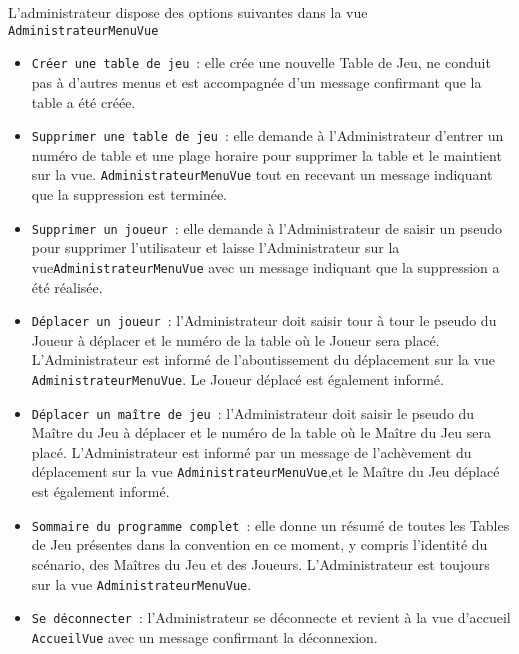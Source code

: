 \documentclass[11pt]{article}
\begin{document}
L'administrateur dispose des options suivantes dans la vue \texttt{AdministrateurMenuVue}
\begin{itemize}[label=, font=\small]
    \item \texttt{Créer une table de jeu}~: elle crée une nouvelle Table de Jeu, ne conduit pas à d'autres menus et est accompagnée d'un message confirmant que la table a été créée.
    \item \texttt{Supprimer une table de jeu}~: elle demande à l'Administrateur d'entrer un numéro de table et une plage horaire pour supprimer la table et le maintient sur la vue. \texttt{AdministrateurMenuVue} tout en recevant un message indiquant que la suppression est terminée.
    \item \texttt{Supprimer un joueur}~: elle demande à l'Administrateur de saisir un pseudo pour supprimer l'utilisateur et laisse l'Administrateur sur la vue\texttt{AdministrateurMenuVue} avec un message indiquant que la suppression a été réalisée.
    \item \texttt{Déplacer un joueur}~: l'Administrateur doit saisir tour à tour le pseudo du Joueur à déplacer et le numéro de la table où le Joueur sera placé. L'Administrateur est informé de l'aboutissement du déplacement sur la vue \texttt{AdministrateurMenuVue}. Le Joueur déplacé est également informé.
    \item \texttt{Déplacer un maître de jeu}~: l'Administrateur doit saisir le pseudo du Maître du Jeu à déplacer et le numéro de la table où le Maître du Jeu sera placé. L'Administrateur est informé par un message de l'achèvement du déplacement sur la vue \texttt{AdministrateurMenuVue},et le Maître du Jeu déplacé est également informé.
    \item \texttt{Sommaire du programme complet}~: elle donne un résumé de toutes les Tables de Jeu présentes dans la convention en ce moment, y compris l'identité du scénario, des Maîtres du Jeu et des Joueurs. L'Administrateur est toujours sur la vue \texttt{AdministrateurMenuVue}.
    \item \texttt{Se déconnecter}~: l'Administrateur se déconnecte et revient à la vue d'accueil \texttt{AccueilVue} avec un message confirmant la déconnexion.
\end{itemize}
\bigbreak
\end{document}
